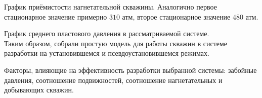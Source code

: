 \documentclass[main.tex]{subfiles}
\begin{document}

График приёмистости нагнетательной скважины. Аналогично первое стационарное значение примерно $310$ атм, второе стационарное значение $480$ атм.


График среднего пластового давления в рассматриваемой системе.\\

Таким образом, собрали простую модель для работы скважин в системе разработки на установившемся и псевдоустановившемся режимах.

Факторы, влияющие на эффективность разработки выбранной системы: забойные давления, соотношение подвижностей, соотношение нагнетательных и добывающих скважин.
\end{document}
